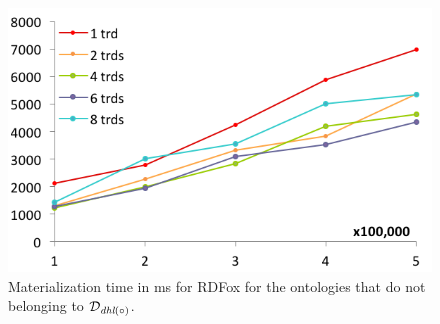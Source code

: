 \begin{figure}[htbp]
\begin{minipage}{.45\textwidth}
  \end{minipage}
  \begin{minipage}{.45\textwidth}
    \includegraphics[width=\textwidth]{experimentalResults/4-skeleton-rdfox}
  \end{minipage}
  \caption{Materialization time in ms for RDFox for the
    ontologies that do not belonging to $\mathcal{D}_{\textit{\text{dhl}}(\circ)}$.~\label{fig:eval}}
\end{figure}

